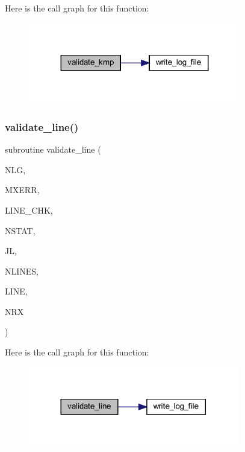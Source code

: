 Here is the call graph for this function\+:\nopagebreak
\begin{figure}[H]
\begin{center}
\leavevmode
\includegraphics[width=263pt]{Leroi__c_8f90_a2cd90fa43f6deaeb4a86b02b8494d638_cgraph}
\end{center}
\end{figure}
\mbox{\label{Leroi__c_8f90_aac9f78ba0dc05544c1babba6dc4ac636}} 
\subsubsection{\texorpdfstring{validate\+\_\+line()}{validate\_line()}}
{\footnotesize\ttfamily subroutine validate\+\_\+line (\begin{DoxyParamCaption}\item[{integer}]{N\+LG,  }\item[{integer}]{M\+X\+E\+RR,  }\item[{integer}]{L\+I\+N\+E\+\_\+\+C\+HK,  }\item[{integer}]{N\+S\+T\+AT,  }\item[{integer}]{JL,  }\item[{integer}]{N\+L\+I\+N\+ES,  }\item[{integer, dimension(nlines)}]{L\+I\+NE,  }\item[{integer, dimension(nlines)}]{N\+RX }\end{DoxyParamCaption})}

Here is the call graph for this function\+:\nopagebreak
\begin{figure}[H]
\begin{center}
\leavevmode
\includegraphics[width=260pt]{Leroi__c_8f90_aac9f78ba0dc05544c1babba6dc4ac636_cgraph}
\end{center}
\end{figure}
\mbox{\label{Leroi__c_8f90_aa07d276404c70df8a716f8407fa09445}} 
